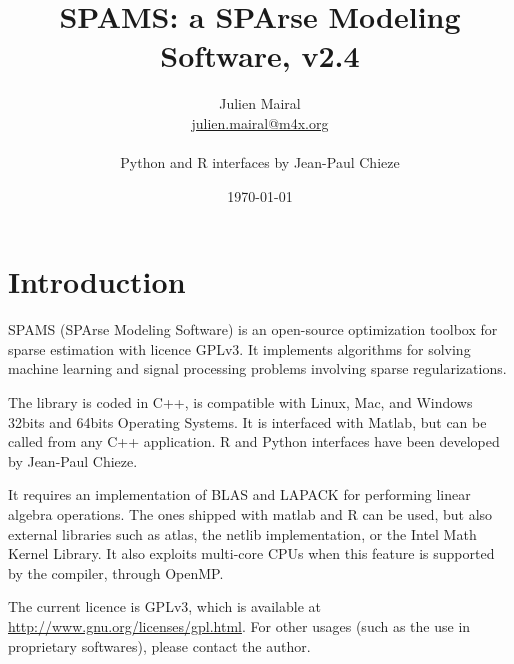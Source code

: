 \documentclass[a4paper, 11pt]{article}
\title{SPAMS: a SPArse Modeling Software, v2.4}
\date{\today}
\author{Julien Mairal \\
   \url{julien.mairal@m4x.org} \\ 
   ~\\
   Python and R interfaces by Jean-Paul Chieze
}
\begin{document}
\maketitle

\tableofcontents

\section{Introduction}
SPAMS (SPArse Modeling Software) is an open-source optimization toolbox for
sparse estimation with licence GPLv3.  It implements algorithms for solving
machine learning and signal processing problems involving sparse
regularizations.

The library is coded in C++, is compatible with Linux, Mac, and Windows 32bits
and 64bits Operating Systems. It is interfaced with Matlab, but can be called
from any C++ application. R and Python interfaces have been developed by
Jean-Paul Chieze.

It requires an implementation of BLAS and LAPACK for performing
linear algebra operations. The ones shipped with matlab and R can be used,
but also external libraries such as atlas, the netlib implementation, or the
Intel Math Kernel Library.  It also exploits multi-core CPUs when this feature
is supported by the compiler, through OpenMP.

The current licence is GPLv3, which is available at
\url{http://www.gnu.org/licenses/gpl.html}.  For other usages (such as the use
in proprietary softwares), please contact the author.
\end{document}
